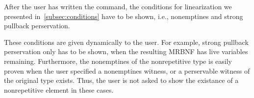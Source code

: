     After the user has written the command, the conditions for linearization we presented in~\autoref{subsec:conditions} have to be shown, i.e., nonemptines and strong pullback perservation. 
    
    These conditions are given dynamically to the user. For example, strong pullback perservation only has to be shown, when the resulting \ac{MRBNF} has live variables remaining. Furthermore, the nonemptines of the nonrepetitive type is easily proven when the user specified a nonemptines witness, or a perservable witness of the original type exists. Thus, the user is not asked to show the existance of a nonrepetitive element in these cases.

    
    

    

  